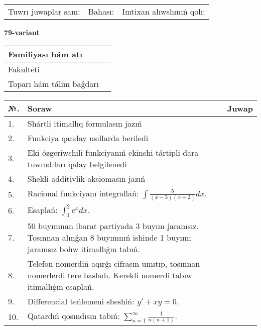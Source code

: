 \documentclass{article}
\begin{document}
\vspace{1cm}

\begin{tabular}{ c c c }
Tuwrı juwaplar sanı: \underline{\hspace{2cm}} & Bahası: \underline{\hspace{2cm}} & Imtixan alıwshınıń qolı: \underline{\hspace{2cm}} \\
\end{tabular}

\newpage

\begin{center}\textbf{79-variant}\end{center}

\bgroup
\def\arraystretch{1.5}
\begin{tabular}{ |m{6cm}|m{10cm}| }
  \hline
  Familiyası hám atı & \\
  \hline
  Fakulteti &\\
  \hline
  Toparı hám tálim baǵdarı & \\
  \hline
\end{tabular}
\egroup

\vspace{0.5cm}

\bgroup
\def\arraystretch{2}
\begin{tabular}{ |l|m{8cm}|m{7cm}| }
  \hline
  №. & Soraw & Juwap \\
  \hline
  1. & Shártli itimallıq formulasın jazıń &  \\
  \hline
  2. & Funkciya qanday usıllarda beriledi &  \\
  \hline
  3. & Eki ózgeriwshili funkciyanıń ekinshi tártipli dara tuwındıları qalay belgilenedi &  \\
  \hline
  4. & Shekli additivlik aksiomasın jazıń &  \\
  \hline
  5. & Racional funkciyanı integrallań: $\displaystyle\int {\frac{5}{(x - 3)(x + 2)}dx}$. &  \\
  \hline
  6. & Esaplań: $\displaystyle\int_{1}^{2}{e^{x}dx}$. &  \\
  \hline
  7. & 50 buyımnan ibarat partiyada 3 buyım jaramsız. Tosınnan alınǵan 8 buyımnıń ishinde 1 buyımı jaramsız bolıw itimallıǵın tabıń. &  \\
  \hline
  8. & Telefon nomerdiń aqırǵı cifrasın umıtıp, tosınnan nomerlerdi tere basladı. Kerekli nomerdi tabıw itimallıǵın esaplań. &  \\
  \hline
  9. & Differencial teńlemeni sheshiń: $y' + xy = 0$. &  \\
  \hline
  10. & Qatardıń qosındısın tabıń: $\displaystyle\sum_{n = 1}^{\infty}\frac{1}{n(n + 1)}$. &  \\
  \hline
\end{tabular}
\egroup
\end{document}

